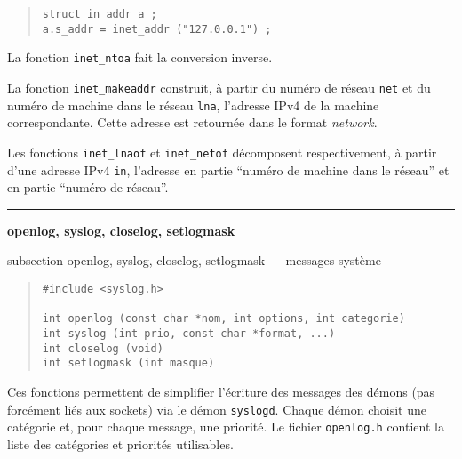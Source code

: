 \documentclass [twoside] {report}
\newcommand {\primitive} [1]
    {
	{\large \bf #1}
	\addcontentsline {toc} {subsection} {#1}
    }
\newcommand {\separation}
    {
	\vspace {7mm}
	\nopagebreak
	\hrule
    }
\begin{document}
\begin {quote}
\begin {verbatim}
struct in_addr a ;
a.s_addr = inet_addr ("127.0.0.1") ;
\end{verbatim}
\end {quote}

La fonction {\tt inet\_ntoa} fait la conversion inverse.

La fonction {\tt inet\_makeaddr} construit, à partir du numéro de réseau
{\tt net} et du numéro de machine dans le réseau {\tt lna}, l'adresse IPv4
de la machine correspondante. Cette adresse est retournée dans le format
{\em network}.

Les fonctions {\tt inet\_lnaof} et {\tt inet\_netof} décomposent
respectivement, à partir d'une adresse IPv4 {\tt in}, l'adresse en partie
``numéro de machine dans le réseau'' et en partie ``numéro de réseau''.



\separation
\primitive {openlog, syslog, closelog, setlogmask} --- messages système

\begin {quote}
\begin {verbatim}
#include <syslog.h>

int openlog (const char *nom, int options, int categorie)
int syslog (int prio, const char *format, ...)
int closelog (void)
int setlogmask (int masque)
\end{verbatim}
\end {quote}

Ces fonctions permettent de simplifier l'écriture des messages des
démons (pas forcément liés aux sockets) via le démon {\tt syslogd}.
Chaque démon choisit une catégorie et, pour chaque message, une
priorité. Le fichier {\tt openlog.h} contient la liste des catégories et
priorités utilisables.
\end{document}
